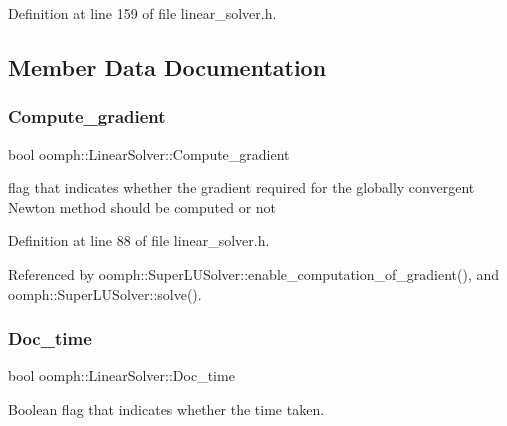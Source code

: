Definition at line 159 of file linear\+\_\+solver.\+h.



\subsection{Member Data Documentation}
\mbox{\label{classoomph_1_1LinearSolver_aef857e4c0c16e8b342a14493e558bb15}} 
\subsubsection{\texorpdfstring{Compute\+\_\+gradient}{Compute\_gradient}}
{\footnotesize\ttfamily bool oomph\+::\+Linear\+Solver\+::\+Compute\+\_\+gradient\hspace{0.3cm}{\ttfamily [protected]}}



flag that indicates whether the gradient required for the globally convergent Newton method should be computed or not 



Definition at line 88 of file linear\+\_\+solver.\+h.



Referenced by oomph\+::\+Super\+L\+U\+Solver\+::enable\+\_\+computation\+\_\+of\+\_\+gradient(), and oomph\+::\+Super\+L\+U\+Solver\+::solve().

\mbox{\label{classoomph_1_1LinearSolver_a536e41b50b3f3464ca9cb4a5776acc19}} 
\subsubsection{\texorpdfstring{Doc\+\_\+time}{Doc\_time}}
{\footnotesize\ttfamily bool oomph\+::\+Linear\+Solver\+::\+Doc\+\_\+time\hspace{0.3cm}{\ttfamily [protected]}}



Boolean flag that indicates whether the time taken. 



